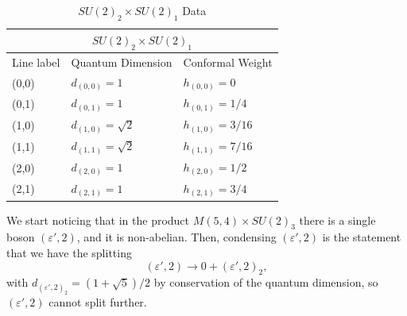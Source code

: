 \documentclass[11pt]{article}
\numberwithin{equation}{section}
\begin{document}
\begin{table}[!b]
\centering
\begin{tabular}[h]{|p{4cm}|p{4cm}|p{4cm}| }
\hline 
\multicolumn{3}{|c|}{$SU(2)_{2} \times SU(2)_{1}$} \\
\hline
Line label & Quantum Dimension & Conformal Weight  \\
\hline
(0,0) & $d_{(0,0)} = 1$ & $h_{(0,0)} = 0$ \\
(0,1) & $d_{(0,1)} = 1$ & $h_{(0,1)} = 1/4$ \\
(1,0) & $d_{(1,0)} = \sqrt{2}$ & $h_{(1,0)} = 3/16$ \\
(1,1) & $d_{(1,1)} = \sqrt{2}$ & $h_{(1,1)} = 7/16$ \\
(2,0) & $d_{(2,0)} = 1$ & $h_{(2,0)} = 1/2$ \\
(2,1) & $d_{(2,1)} = 1$ & $h_{(2,1)} = 3/4$ \\
\hline
\end{tabular}
\caption{$SU(2)_{2} \times SU(2)_{1}$ Data}  \label{su2lv1timessu2lv2table}
\end{table}

We start noticing that in the product $M(5,4) \times SU(2)_{3}$ there is a single boson $(\varepsilon',2)$, and it is non-abelian. Then, condensing $(\varepsilon',2)$ is the statement that we have the splitting
\begin{equation} \label{varepsilonprime2splitting}
    (\varepsilon',2) \to 0 + (\varepsilon',2)_{2},
\end{equation}
with $d_{(\varepsilon',2)_{2}} = (1+\sqrt{5})/2$ by conservation of the quantum dimension, so $(\varepsilon',2)$ cannot split further.
\end{document}
